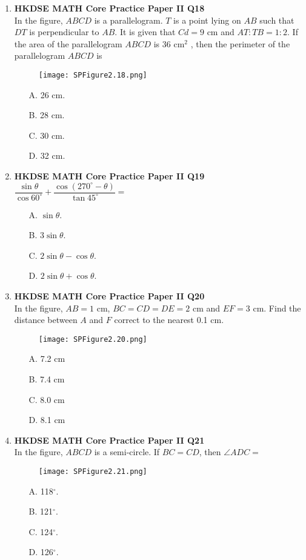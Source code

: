 \documentclass[12pt]{article}
\begin{document}
\begin{enumerate}
	\item \textbf{HKDSE MATH Core Practice Paper II Q18}\\
	In the figure, $ABCD$ is a parallelogram. $T$ is a point lying on $AB$ such that $DT$ is perpendicular to $AB$. It is given that $Cd = 9$ cm and $AT : TB = 1 : 2$. If the area of the parallelogram $ABCD$ is 36 cm$^2$ , then the perimeter of the parallelogram $ABCD$ is
	\begin{figure}[H]
		\centering
		\texttt{[image: SPFigure2.18.png]}	
	\end{figure}
	\begin{enumerate}
		\item[A.] 26 cm.
		\item[B.] 28 cm.
		\item[C.] 30 cm.
		\item[D.] 32 cm.
	\end{enumerate}

	\item \textbf{HKDSE MATH Core Practice Paper II Q19}\\
	$\dfrac{\sin{\theta}}{\cos{60^\circ}} + \dfrac{\cos{(270^\circ - \theta)}}{\tan{45^\circ}} = $ 
	\begin{enumerate}
		\item[A.] $\sin{\theta}$.
		\item[B.] $3\sin{\theta}$.
		\item[C.] $2\sin{\theta} - \cos{\theta}$.
		\item[D.] $2\sin{\theta} + \cos{\theta}$.
	\end{enumerate}

	\item \textbf{HKDSE MATH Core Practice Paper II Q20}\\
	In the figure, $AB = 1$ cm, $BC = CD = DE = 2$ cm and $EF = 3$ cm. Find the distance between $A$ and $F$ correct to the nearest 0.1 cm.
	\begin{figure}[H]
		\centering
		\texttt{[image: SPFigure2.20.png]}	
	\end{figure}
	\begin{enumerate}
		\item[A.] 7.2 cm
		\item[B.] 7.4 cm
		\item[C.] 8.0 cm
		\item[D.] 8.1 cm
	\end{enumerate}

	\item \textbf{HKDSE MATH Core Practice Paper II Q21}\\
	In the figure, $ABCD$ is a semi-circle. If $BC = CD$, then $\angle ADC = $
	\begin{figure}[H]
		\centering
		\texttt{[image: SPFigure2.21.png]}	
	\end{figure}
	\begin{enumerate}
		\item[A.] 118$^\circ$.
		\item[B.] 121$^\circ$.
		\item[C.] 124$^\circ$.
		\item[D.] 126$^\circ$.
	\end{enumerate}


\end{enumerate}
\end{document}
